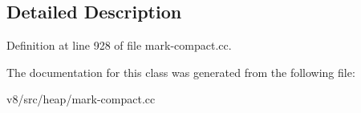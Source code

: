 \subsection{Detailed Description}


Definition at line 928 of file mark-\/compact.\+cc.



The documentation for this class was generated from the following file\+:\begin{DoxyCompactItemize}
\item 
v8/src/heap/mark-\/compact.\+cc\end{DoxyCompactItemize}
